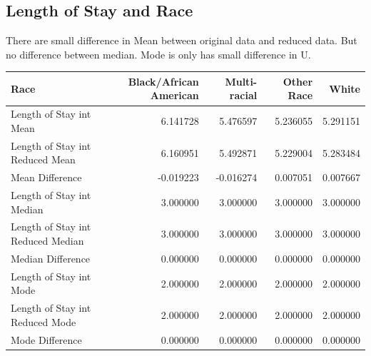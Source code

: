 \documentclass[
	letterpaper, %
]{jdf}
\begin{document}
\subsection{Length of Stay and Race}
There are small difference in Mean between original data and reduced data. But no difference between median. Mode is only has small difference in U.  
\begin{jdftable}
\label{table:Example}
\small %
\begin{tabular}{@{} lrrrr}
\textbf{Race} & \textbf{Black/African American} &\textbf{Multi-racial} & \textbf{Other Race} &\textbf{White}\\
	\toprule[0.5pt]
Length of Stay int Mean           &                6.141728 &      5.476597 &    5.236055 &  5.291151 \\\midrule
Length of Stay int Reduced Mean   &                6.160951 &      5.492871 &    5.229004 &  5.283484 \\\midrule
Mean Difference                   &               -0.019223 &     -0.016274 &    0.007051 &  0.007667 \\\midrule
Length of Stay int Median         &                3.000000 &      3.000000 &    3.000000 &  3.000000 \\\midrule
Length of Stay int Reduced Median &                3.000000 &      3.000000 &    3.000000 &  3.000000 \\\midrule
Median Difference                 &                0.000000 &      0.000000 &    0.000000 &  0.000000 \\\midrule
Length of Stay int Mode           &                2.000000 &      2.000000 &    2.000000 &  2.000000 \\\midrule
Length of Stay int Reduced Mode   &                2.000000 &      2.000000 &    2.000000 &  2.000000 \\\midrule
Mode Difference                   &                0.000000 &      0.000000 &    0.000000 &  0.000000 \\
\end{tabular}
\end{jdftable}
\end{document}
